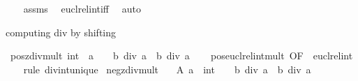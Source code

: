 \begin{isabellebody}
%
\isadelimproof
\ \ %
\endisadelimproof
%
\isatagproof
{}\isamarkupfalse%
\ assms\ \isamarkupfalse%
\ eucl{\isacharunderscore}{\kern0pt}rel{\isacharunderscore}{\kern0pt}int{\isacharunderscore}{\kern0pt}iff\ \isamarkupfalse%
\ auto%
\endisatagproof
{\isafoldproof}%
%
\isadelimproof
%
\endisadelimproof
%
\begin{isamarkuptext}%
computing div by shifting%
\end{isamarkuptext}\isamarkuptrue%
\isamarkupfalse%
\ pos{\isacharunderscore}{\kern0pt}zdiv{\isacharunderscore}{\kern0pt}mult{\isacharunderscore}{\kern0pt}{}{\isacharcolon}{\kern0pt}\ {\isachardoublequoteopen}{\isacharparenleft}{\kern0pt}{}{\isacharcolon}{\kern0pt}{\isacharcolon}{\kern0pt}int{\isacharparenright}{\kern0pt}\ {\isasymle}\ a\ {\isacharequal}{\kern0pt}{\isacharequal}{\kern0pt}{\isachargreater}{\kern0pt}\ {\isacharparenleft}{\kern0pt}{}\ {\isacharplus}{\kern0pt}\ {}{\isacharasterisk}{\kern0pt}b{\isacharparenright}{\kern0pt}\ div\ {\isacharparenleft}{\kern0pt}{}{\isacharasterisk}{\kern0pt}a{\isacharparenright}{\kern0pt}\ {\isacharequal}{\kern0pt}\ b\ div\ a{\isachardoublequoteclose}\isanewline
%
\isadelimproof
\ \ %
\endisadelimproof
%
\isatagproof
{}\isamarkupfalse%
\ pos{\isacharunderscore}{\kern0pt}eucl{\isacharunderscore}{\kern0pt}rel{\isacharunderscore}{\kern0pt}int{\isacharunderscore}{\kern0pt}mult{\isacharunderscore}{\kern0pt}{}\ {\isacharbrackleft}{\kern0pt}OF\ {\isacharunderscore}{\kern0pt}\ eucl{\isacharunderscore}{\kern0pt}rel{\isacharunderscore}{\kern0pt}int{\isacharbrackright}{\kern0pt}\isanewline
\ \ \isamarkupfalse%
\ {\isacharparenleft}{\kern0pt}rule\ div{\isacharunderscore}{\kern0pt}int{\isacharunderscore}{\kern0pt}unique{\isacharparenright}{\kern0pt}%
\endisatagproof
{\isafoldproof}%
%
\isadelimproof
\isanewline
%
\endisadelimproof
\isanewline
{}\isamarkupfalse%
\ neg{\isacharunderscore}{\kern0pt}zdiv{\isacharunderscore}{\kern0pt}mult{\isacharunderscore}{\kern0pt}{}{\isacharcolon}{\kern0pt}\isanewline
\ \ \ A{\isacharcolon}{\kern0pt}\ {\isachardoublequoteopen}a\ {\isasymle}\ {\isacharparenleft}{\kern0pt}{}{\isacharcolon}{\kern0pt}{\isacharcolon}{\kern0pt}int{\isacharparenright}{\kern0pt}{\isachardoublequoteclose}\ \ {\isachardoublequoteopen}{\isacharparenleft}{\kern0pt}{}\ {\isacharplus}{\kern0pt}\ {}{\isacharasterisk}{\kern0pt}b{\isacharparenright}{\kern0pt}\ div\ {\isacharparenleft}{\kern0pt}{}{\isacharasterisk}{\kern0pt}a{\isacharparenright}{\kern0pt}\ {\isacharequal}{\kern0pt}\ {\isacharparenleft}{\kern0pt}b{\isacharplus}{\kern0pt}{}{\isacharparenright}{\kern0pt}\ div\ a{\isachardoublequoteclose}\isanewline

\end{isabellebody}
